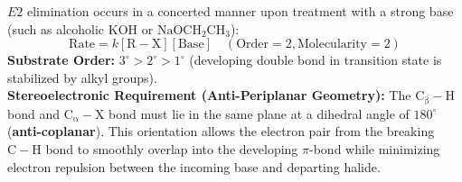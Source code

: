 \documentclass[10pt,a4paper]{article}
\begin{document}
\begin{conceptbox}
$E2$ elimination occurs in a concerted manner upon treatment with a strong base (such as alcoholic $\mathrm{KOH}$ or $\mathrm{NaOCH_2CH_3}$):
\begin{equation}
  \text{Rate} = k[\mathrm{R-X}][\text{Base}] \quad (\text{Order} = 2, \text{Molecularity} = 2)
\end{equation}
\textbf{Substrate Order:} $3^\circ > 2^\circ > 1^\circ$ (developing double bond in transition state is stabilized by alkyl groups).\\[4pt]
\textbf{Stereoelectronic Requirement (Anti-Periplanar Geometry):}
The $\mathrm{C_\beta-H}$ bond and $\mathrm{C_\alpha-X}$ bond must lie in the same plane at a dihedral angle of $180^\circ$ (\textbf{anti-coplanar}). This orientation allows the electron pair from the breaking $\mathrm{C-H}$ bond to smoothly overlap into the developing $\pi$-bond while minimizing electron repulsion between the incoming base and departing halide.
\end{conceptbox}
\end{document}
